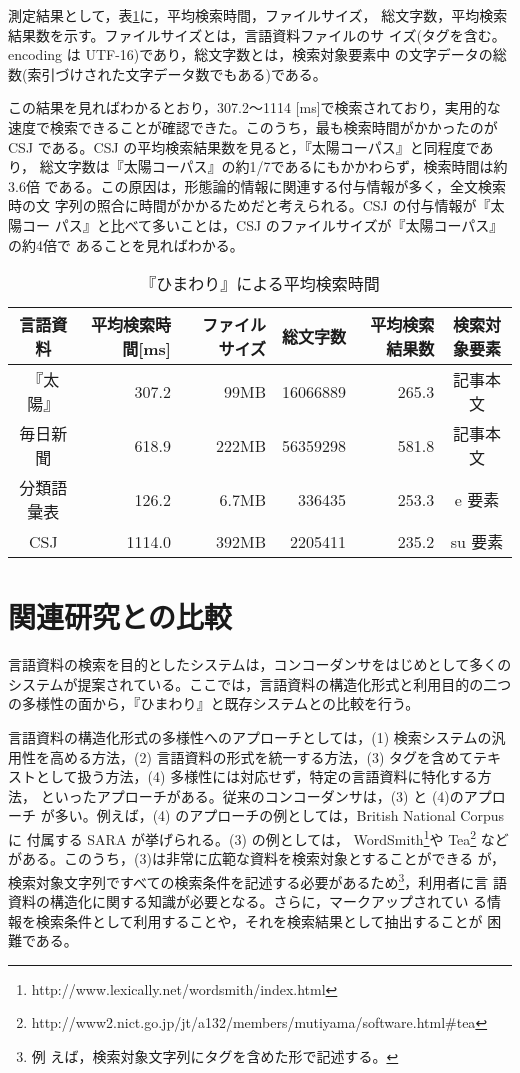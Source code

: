 測定結果として，表\ref{tbl:平均検索時間}に，平均検索時間，ファイルサイズ，
総文字数，平均検索結果数を示す。ファイルサイズとは，言語資料ファイルのサ
イズ(タグを含む。encoding は UTF-16)であり，総文字数とは，検索対象要素中
の文字データの総数(索引づけされた文字データ数でもある)である。

この結果を見ればわかるとおり，307.2〜1114 [ms]で検索されており，実用的な
速度で検索できることが確認できた。このうち，最も検索時間がかかったのが
CSJ である。CSJ の平均検索結果数を見ると，『太陽コーパス』と同程度であり，
総文字数は『太陽コーパス』の約1/7であるにもかかわらず，検索時間は約3.6倍
である。この原因は，形態論的情報に関連する付与情報が多く，全文検索時の文
字列の照合に時間がかかるためだと考えられる。CSJ の付与情報が『太陽コー
パス』と比べて多いことは，CSJ のファイルサイズが『太陽コーパス』の約4倍で
あることを見ればわかる。

 \begin{table}[hbt]
 \begin{center}
  \caption{『ひまわり』による平均検索時間}
  \label{tbl:平均検索時間}
  {\small
  \begin{tabular}{c|r|r|r|r|c}\hline
   {\bf 言語資料} & {\bf 平均検索時間[ms]} & {\bf ファイルサイズ} & {\bf 総文字数} & {\bf 平均検索結果数} & {\bf 検索対象要素}\\ \hline\hline
   『太陽』 & 307.2 & 99MB &16066889 & 265.3 & 記事本文\\
   毎日新聞 & 618.9 & 222MB &56359298 & 581.8 & 記事本文\\
   分類語彙表 & 126.2 & 6.7MB &336435 & 253.3 & e 要素\\
   CSJ & 1114.0 & 392MB & 2205411 & 235.2 & su 要素\\ \hline
  \end{tabular}}
 \end{center}
 \end{table}


\section{関連研究との比較}
言語資料の検索を目的としたシステムは，コンコーダンサをはじめとして多くの
システムが提案されている。ここでは，言語資料の構造化形式と利用目的の二つ
の多様性の面から，『ひまわり』と既存システムとの比較を行う。

言語資料の構造化形式の多様性へのアプローチとしては，(1) 検索システムの汎
用性を高める方法，(2) 言語資料の形式を統一する方法，(3) タグを含めてテキ
ストとして扱う方法，(4) 多様性には対応せず，特定の言語資料に特化する方法，
といったアプローチがある。従来のコンコーダンサは，(3) と (4)のアプローチ
が多い。例えば，(4) のアプローチの例としては，British National Corpus に
付属する SARA  が挙げられる。(3) の例としては，
WordSmith\footnote{http://www.lexically.net/wordsmith/index.html}や 
Tea\footnote{http://www2.nict.go.jp/jt/a132/members/mutiyama/software.html\#tea}
などがある。このうち，(3)は非常に広範な資料を検索対象とすることができる
が，検索対象文字列ですべての検索条件を記述する必要があるため\footnote{例
えば，検索対象文字列にタグを含めた形で記述する。}，利用者に言
語資料の構造化に関する知識が必要となる。さらに，マークアップされてい
る情報を検索条件として利用することや，それを検索結果として抽出することが
困難である。

